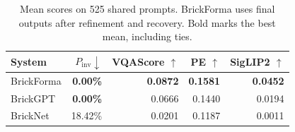 \begin{table}[t]
\centering\small
\setlength{\tabcolsep}{3pt}
\begin{tabular}{lrrrr}
\toprule
System & $P_{\mathrm{inv}}\downarrow$ & VQAScore $\uparrow$ & PE $\uparrow$ & SigLIP2 $\uparrow$ \\
\midrule
BrickForma & \textbf{0.00\%} & \textbf{0.0872} & \textbf{0.1581} & \textbf{0.0452} \\
BrickGPT & \textbf{0.00\%} & 0.0666 & 0.1440 & 0.0194 \\
BrickNet & 18.42\% & 0.0201 & 0.1187 & 0.0011 \\
\bottomrule
\end{tabular}
\caption{Mean scores on 525 shared prompts. BrickForma uses final outputs after refinement and recovery. Bold marks the best mean, including ties.}
\label{tab:main}
\end{table}
